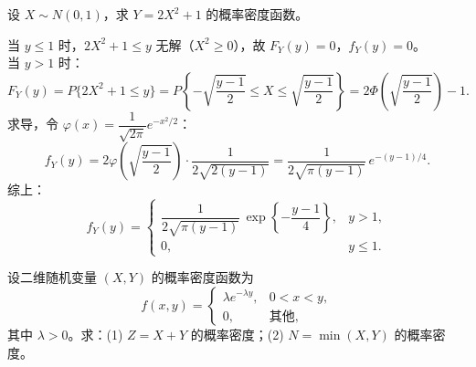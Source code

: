 ﻿\documentclass[lang=cn,11pt]{elegantbook}
\begin{document}
\begin{exercise}[正态平方变换] \label{exer:3-12}
设 $X \sim N(0,1)$，求 $Y = 2X^2 + 1$ 的概率密度函数。
\end{exercise}
\begin{solution}
当 $y \leqslant 1$ 时，$2X^2 + 1 \leqslant y$ 无解（$X^2 \geqslant 0$），故 $F_Y(y) = 0$，$f_Y(y) = 0$。\\
当 $y > 1$ 时：
\[
F_Y(y) = P\{2X^2 + 1 \leqslant y\} = P\!\left\{-\sqrt{\frac{y-1}{2}} \leqslant X \leqslant \sqrt{\frac{y-1}{2}}\right\} = 2\Phi\!\left(\sqrt{\frac{y-1}{2}}\right) - 1.
\]
求导，令 $\varphi(x) = \dfrac{1}{\sqrt{2\pi}}e^{-x^2/2}$：
\[
f_Y(y) = 2\varphi\!\left(\sqrt{\frac{y-1}{2}}\right) \cdot \frac{1}{2\sqrt{2(y-1)}} = \frac{1}{2\sqrt{\pi(y-1)}}\,e^{-(y-1)/4}.
\]
综上：
\[
f_Y(y) = \begin{cases} \dfrac{1}{2\sqrt{\pi(y-1)}}\,\exp\!\left\{-\dfrac{y-1}{4}\right\}, & y > 1, \\ 0, & y \leqslant 1. \end{cases}
\]
\end{solution}



\begin{exercise}[指数分布条件区域] \label{exer:3-12b}
设二维随机变量 $(X,Y)$ 的概率密度函数为
\[
f(x,y) = \begin{cases} \lambda e^{-\lambda y}, & 0 < x < y, \\ 0, & \text{其他}, \end{cases}
\]
其中 $\lambda > 0$。求：(1) $Z = X + Y$ 的概率密度；(2) $N = \min(X,Y)$ 的概率密度。
\end{exercise}
\end{document}
